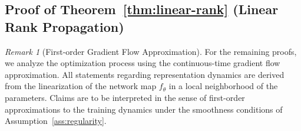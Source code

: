 \documentclass{article}
\theoremstyle{plain}
\theoremstyle{definition}
\theoremstyle{remark}
\newtheorem{remark}[theorem]{Remark}
\begin{document}
\subsection{Proof of Theorem~\ref{thm:linear-rank} (Linear Rank Propagation)}

\begin{remark}[First-order Gradient Flow Approximation]
    \label{rem:gradient-flow-approx}
    For the remaining proofs, we analyze the optimization process using the continuous-time gradient flow approximation. All statements regarding representation dynamics are derived from the linearization of the network map $f_\theta$ in a local neighborhood of the parameters. Claims are to be interpreted in the sense of first-order approximations to the training dynamics under the smoothness conditions of Assumption~\ref{ass:regularity}.
\end{remark}
\end{document}
